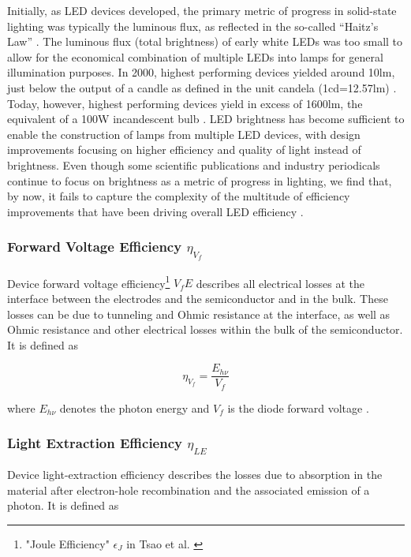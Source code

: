 \documentclass[twoside,twocolumn,9pt]{article}
\begin{document}
Initially, as LED devices developed, the primary metric of progress in solid-state lighting was typically the luminous flux, as reflected in the so-called “Haitz’s Law” \cite{haitz1999case}\cite{haitz2011solid}. The luminous flux (total brightness) of early white LEDs was too small to allow for the economical combination of multiple LEDs into lamps for general illumination purposes. In 2000, highest performing devices yielded around 10lm, just below the output of a candle as defined in the unit candela (1cd=12.57lm) \cite{haitz2011solid}. Today, however, highest performing devices yield in excess of 1600lm, the equivalent of a 100W incandescent bulb \cite{cree2020bright}. LED brightness has become sufficient to enable the construction of lamps from multiple LED devices, with design improvements focusing on higher efficiency and quality of light instead of brightness. Even though some scientific publications and industry periodicals continue to focus on brightness as a metric of progress in lighting, we find that, by now, it fails to capture the complexity of the multitude of efficiency improvements that have been driving overall LED efficiency \cite{weinold2021compound}. 

\subsubsection{Forward Voltage Efficiency $\eta_{V_f}$}

Device forward voltage efficiency\footnote{"Joule Efficiency" $\epsilon_J$ in Tsao et al. \cite{tsao2010solid}} $V_fE$ describes all electrical losses at the interface between the electrodes and the semiconductor and in the bulk. These losses can be due to tunneling and Ohmic resistance at the interface, as well as Ohmic resistance and other electrical losses within the bulk of the semiconductor. It is defined as

\begin{equation}
    \eta_{V_f} = \frac{E_{h\nu}}{V_f}
\end{equation}

where $E_{h\nu}$ denotes the photon energy and $V_f$ is the diode forward voltage \cite{schubert2018light}\cite{tsao2010solid}.

\subsubsection{Light Extraction Efficiency $\eta_{LE}$}

Device light-extraction efficiency describes the  losses due to absorption in the material after electron-hole recombination and the associated emission of a photon. It is defined as
\end{document}
